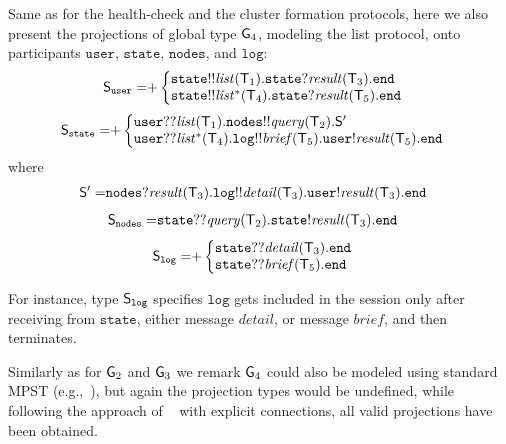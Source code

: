 \noindent
Same as for the health-check and the cluster formation protocols, here we also present the projections of global type ${\sf G}_4$, modeling the list protocol, onto participants $\mathtt{user}$, $\mathtt{state}$, $\mathtt{nodes}$, and $\mathtt{log}$:
\begin{align*}
	\ST_\mathtt{user} =& 
	{+}
	\left\{
	\begin{array}{@{}l@{}}  
	\mathtt{state}{!!}\mathit{list}(\T_1).\mathtt{state}{?}\mathit{result}(\T_3).\tend \\
	\mathtt{state}{!!}\mathit{list^*}(\T_4).\mathtt{state}{?}\mathit{result}(\T_5).\tend 
	\end{array} \right.
\end{align*}
\begin{align*}
	\ST_\mathtt{state} =&
	{+}
	\left\{
	\begin{array}{@{}l@{}}  
	\mathtt{user}{??}\mathit{list}(\T_1).\mathtt{nodes}{!!}\mathit{query}(\T_2).\ST'\\
	\mathtt{user}{??}\mathit{list^*}(\T_4).\mathtt{log}{!!}\mathit{brief}(\T_5).\mathtt{user}{!}\mathit{result}(\T_5).\tend
	\end{array} \right. 
\end{align*}
where
\begin{align*}
	{\mathsf S}'  =& 
	\mathtt{nodes}{?}\mathit{result}({\mathsf T}_3).\mathtt{log}{!!}\mathit{detail}({\mathsf T}_3).\mathtt{user}{!}\mathit{result}({\mathsf T}_3).\mathtt{end}
\end{align*}
\begin{align*}
	{\mathsf S}_\mathtt{nodes} = &
	\mathtt{state}{??}\mathit{query}({\mathsf T}_2).\mathtt{state}{!}\mathit{result}({\mathsf T}_3).\mathtt{end}
\end{align*}
\begin{align*}
	\ST_\mathtt{log} = & 
	{+}
	\left\{
	\begin{array}{@{}l@{}}  
	\mathtt{state}{??}\mathit{detail}(\T_3).\tend \\
	\mathtt{state}{??}\mathit{brief}(\T_5).\tend \\
	\end{array} \right.
\end{align*}

\noindent
For instance, type ${\mathsf S}_\mathtt{log}$ specifies $\mathtt{log}$ gets included in the session only after receiving from $\mathtt{state}$, either message $\mathit{detail}$, or message $\mathit{brief}$, and then terminates. 

Similarly as for ${\sf G}_2$ and ${\sf G}_3$ we remark ${\sf G}_4$ could also be modeled using standard MPST (e.g.,~\cite{HondaYC08}), but again the projection types would be undefined, while following the approach of ~\cite{HuY17} with explicit connections, all valid projections have been obtained.
%
%
